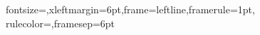   {fontsize=\footnotesize,xleftmargin=6pt,frame=leftline,framerule=1pt,
   rulecolor=\color{outrule},framesep=6pt}

\renewenvironment{quote}
  {\begin{list}{}{\setlength{\leftmargin}{1.2em}\setlength{\rightmargin}{0pt}}%
   \item\relax\color{accent!80!black}\itshape}
  {\end{list}}

\renewcommand{\contentsname}{Mục lục}
\renewcommand{\figurename}{Hình}
\renewcommand{\tablename}{Bảng}

\providecommand{\runninghead}{}
\pagestyle{fancy}
\fancyhf{}
\fancyhead[L]{\footnotesize\itshape\sffamily\color{captiontext}\runninghead}
\fancyhead[R]{\footnotesize\bfseries\sffamily\color{accent}\thepage}
\renewcommand{\headrulewidth}{0.6pt}
\let\oldheadrule\headrule
\renewcommand{\headrule}{{\color{rulegrey}\oldheadrule}}
\fancypagestyle{plain}{\fancyhf{}\renewcommand{\headrulewidth}{0pt}%
  \fancyfoot[C]{\footnotesize\sffamily\color{captiontext}\thepage}}

\setlength{\parskip}{0.45em}
\setlength{\parindent}{0pt}
\setlength{\emergencystretch}{3em}


